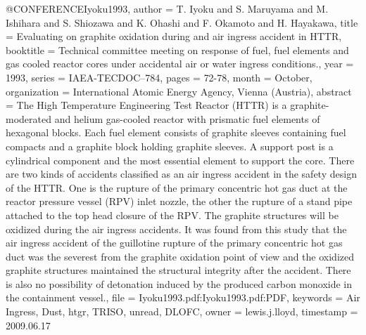 {@CONFERENCE{Iyoku1993,
  author = {T. Iyoku and S. Maruyama and M. Ishihara and S. Shiozawa and K. Ohashi
	and F. Okamoto and H. Hayakawa},
  title = {Evaluating on graphite oxidation during and air ingress accident
	in HTTR},
  booktitle = {Technical committee meeting on response of fuel, fuel elements and
	gas cooled reactor cores under accidental air or water ingress conditions.},
  year = {1993},
  series = {IAEA-TECDOC--784},
  pages = {72-78},
  month = {October},
  organization = {International Atomic Energy Agency, Vienna (Austria)},
  abstract = {The High Temperature Engineering Test Reactor (HTTR) is a graphite-moderated
	and helium gas-cooled reactor with prismatic fuel elements of hexagonal
	blocks. Each fuel element consists of graphite sleeves containing
	fuel compacts and a graphite block holding graphite sleeves. A support
	post is a cylindrical component and the most essential element to
	support the core. There are two kinds of accidents classified as
	an air ingress accident in the safety design of the HTTR. One is
	the rupture of the primary concentric hot gas duct at the reactor
	pressure vessel (RPV) inlet nozzle, the other the rupture of a stand
	pipe attached to the top head closure of the RPV. The graphite structures
	will be oxidized during the air ingress accidents. It was found from
	this study that the air ingress accident of the guillotine rupture
	of the primary concentric hot gas duct was the severest from the
	graphite oxidation point of view and the oxidized graphite structures
	maintained the structural integrity after the accident. There is
	also no possibility of detonation induced by the produced carbon
	monoxide in the containment vessel.},
  file = {Iyoku1993.pdf:Iyoku1993.pdf:PDF},
  keywords = {Air Ingress, Dust, htgr, TRISO, unread, DLOFC},
  owner = {lewis.j.lloyd},
  timestamp = {2009.06.17}
}

}
